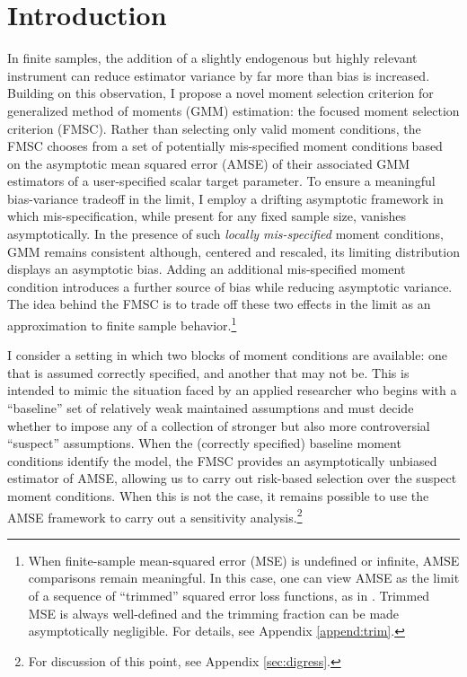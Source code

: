 \section{Introduction}
In finite samples, the addition of a slightly endogenous but highly relevant instrument can reduce estimator variance by far more than bias is increased. 
Building on this observation, I propose a novel moment selection criterion for generalized method of moments (GMM) estimation: the focused moment selection criterion (FMSC). 
Rather than selecting only valid moment conditions, the FMSC chooses from a set of potentially mis-specified moment conditions based on the asymptotic mean squared error (AMSE) of their associated GMM estimators of a user-specified scalar target parameter.
To ensure a meaningful bias-variance tradeoff in the limit, I employ a drifting asymptotic framework in which mis-specification, while present for any fixed sample size, vanishes asymptotically.
In the presence of such \emph{locally mis-specified} moment conditions, GMM remains consistent although, centered and rescaled, its limiting distribution displays an asymptotic bias. Adding an additional mis-specified moment condition introduces a further source of bias while reducing asymptotic variance. 
The idea behind the FMSC is to trade off these two effects in the limit as an approximation to finite sample behavior.\footnote{When finite-sample mean-squared error (MSE) is undefined or infinite, AMSE comparisons remain meaningful. In this case, one can view AMSE as the limit of a sequence of ``trimmed'' squared error loss functions, as in \cite{HansenShrink}. Trimmed MSE is always well-defined and the trimming fraction can be made asymptotically negligible. For details, see Appendix \ref{append:trim}.}
 
I consider a setting in which two blocks of moment conditions are available: one that is assumed correctly specified, and another that may not be.
This is intended to mimic the situation faced by an applied researcher who begins with a ``baseline'' set of relatively weak maintained assumptions and must decide whether to impose any of a collection of stronger but also more controversial ``suspect'' assumptions.
When the (correctly specified) baseline moment conditions identify the model, the FMSC provides an asymptotically unbiased estimator of AMSE, allowing us to carry out risk-based selection over the suspect moment conditions.
When this is not the case, it remains possible to use the AMSE framework to carry out a sensitivity analysis.\footnote{For discussion of this point, see Appendix \ref{sec:digress}.}


